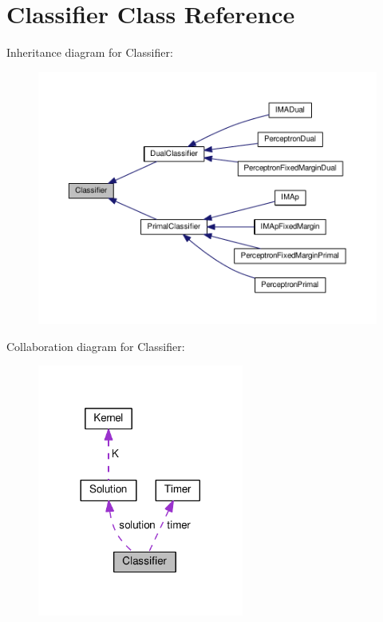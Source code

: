 \hypertarget{class_classifier}{}\section{Classifier Class Reference}
\label{class_classifier}


Inheritance diagram for Classifier\+:\nopagebreak
\begin{figure}[H]
\begin{center}
\leavevmode
\includegraphics[width=350pt]{class_classifier__inherit__graph}
\end{center}
\end{figure}


Collaboration diagram for Classifier\+:\nopagebreak
\begin{figure}[H]
\begin{center}
\leavevmode
\includegraphics[width=192pt]{class_classifier__coll__graph}
\end{center}
\end{figure}
